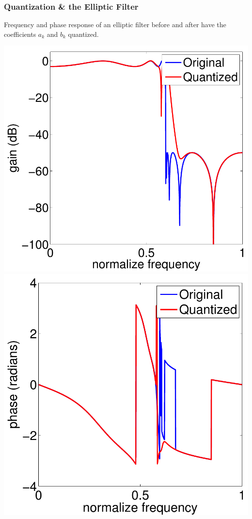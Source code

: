 \documentclass[mathserif,9pt,handout]{beamer}
\begin{document}
\begin{frame}\frametitle{Quantization \& the Elliptic Filter}\small
  \begin{center}
    Frequency and phase response of an elliptic filter before and after have the coefficients $a_k$ and 
    $b_k$ quantized. \\
    \vspace{1em}
    
    \includegraphics[height=.55\textheight]{ellip_freq.pdf} \hspace{1em}
    \includegraphics[height=.55\textheight]{ellip_phase.pdf}
  \end{center}
\end{frame}
\end{document}
